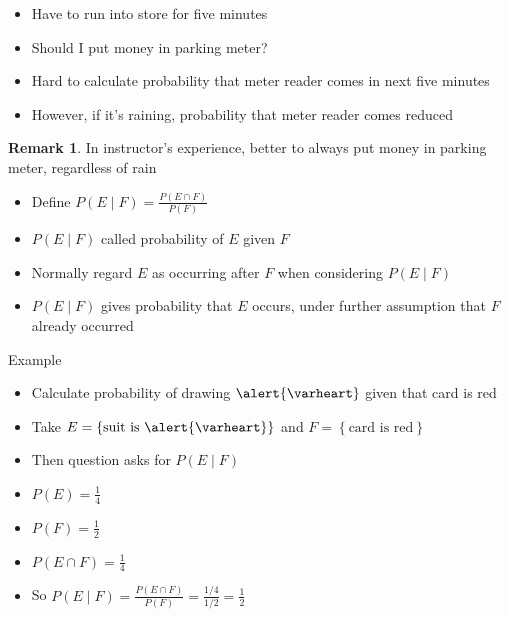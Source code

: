 \documentclass[handout]{beamer}
\theoremstyle{definition}
\newtheorem{remark}{Remark}
\begin{document}
\begin{frame}
\begin{example}
\begin{itemize}
\item Have to run into store for five minutes
\item Should I put money in parking meter?
\item Hard to calculate probability that meter reader
comes in next five minutes
\item However, if it's raining, probability that meter reader
comes reduced
\end{itemize}
\end{example}
\begin{remark}
In instructor's experience, better to always put money
in parking meter, regardless of rain
\end{remark}
\end{frame}

\begin{frame}
\begin{definition}
\begin{itemize}
\item Define $P\left(E\mid F\right)
=\frac{P\left(E\cap F\right)}{P\left(F\right)}$
\item $P\left(E\mid F\right)$ called
\alert{probability of $E$ given $F$}
\end{itemize}
\end{definition}
\begin{itemize}
\item Normally regard $E$ as occurring
\alert{after} $F$ when considering $P\left(E\mid F\right)$
\item $P\left(E\mid F\right)$ gives probability that $E$ occurs,
under further assumption that $F$ already occurred
\end{itemize}
\end{frame}

\begin{frame}{Example}
\begin{itemize}
\item Calculate probability of drawing $\alert{\varheart}$ given
that card is red
\item Take $E=\left\{\text{suit is $\alert{\varheart}$}\right\}$
and $F=\left\{\text{card is red}\right\}$
\item Then question asks for $P\left(E\mid F\right)$
\item $P\left(E\right)=\frac{1}{4}$
\item $P\left(F\right)=\frac{1}{2}$
\item $P\left(E\cap F\right)=\frac{1}{4}$
\item So $P\left(E\mid F\right)
=\frac{P\left(E\cap F\right)}{P\left(F\right)}=\frac{1/4}{1/2}=\frac{1}{2}$
\end{itemize}
\end{frame}
\end{document}
